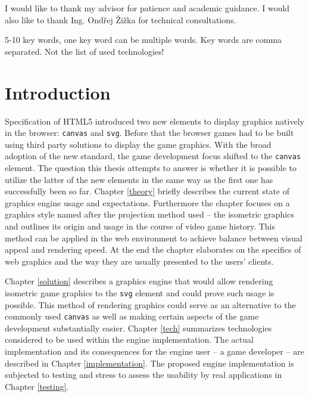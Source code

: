 \documentclass[11pt,oneside, final]{fithesis2}
\begin{document}
  
\FrontMatter  
\ThesisTitlePage  
 
\begin{ThesisDeclaration}  
\DeclarationText  
\AdvisorName  
\end{ThesisDeclaration}  
 
\begin{ThesisThanks}  
I would like to thank my advisor for patience and academic guidance. I would also like to thank Ing. Ondřej Žižka for technical consultations.
\end{ThesisThanks}  
 
\begin{ThesisAbstract}  

\end{ThesisAbstract}  
 
\begin{ThesisKeyWords}  
5-10 key words, one key word can be multiple words. Key words are comma separated. Not the list of used technologies!
\end{ThesisKeyWords}  
 
\MainMatter
 
\tableofcontents          %
 
\chapter{Introduction}
Specification of HTML5 introduced two new elements to display graphics natively in the browser: \texttt{canvas} and \texttt{svg}\cite{w3_html5}. Before that the browser games had to be built using third party solutions to display the game graphics\cite{pagella}. With the broad adoption of the new standard, the game development focus shifted to the \texttt{canvas} element\cite{pagella}. The question this thesis attempts to answer is whether it is possible to utilize the latter of the new elements in the same way as the first one has successfully been so far. Chapter \ref{theory} briefly describes the current state of graphics engine usage and expectations. Furthermore the chapter focuses on a graphics style named after the projection method used -- the isometric graphics and outlines its origin and usage in the course of video game history. This method can be applied in the web environment to achieve balance between visual appeal and rendering speed. At the end the chapter elaborates on the specifics of web graphics and the way they are usually presented to the users' clients.

Chapter \ref{solution} describes a graphics engine that would allow rendering isometric game graphics to the \texttt{svg} element and could prove such usage is possible. This method of rendering graphics could serve as an alternative to the commonly used \texttt{canvas} as well as making certain aspects of the game development substantially easier. Chapter \ref{tech} summarizes technologies considered to be used within the engine implementation. The actual implementation and its consequences for the engine user -- a game developer -- are described in Chapter \ref{implementation}. The proposed engine implementation is subjected to testing and stress to assess the usability by real applications in Chapter \ref{testing}.
\end{document}
